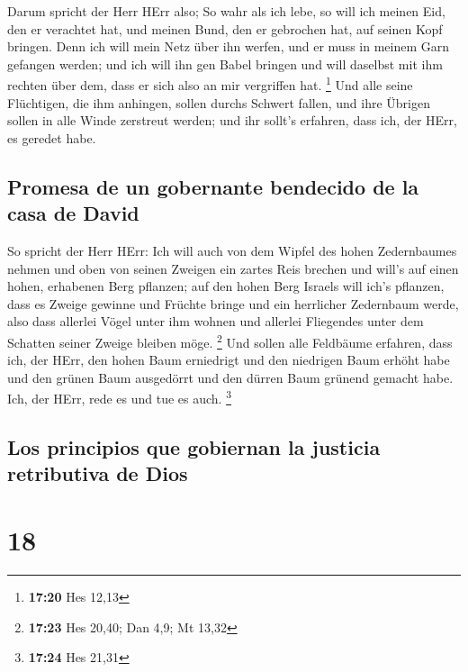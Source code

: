  Darum spricht der Herr HErr also; So wahr als ich lebe,
so will ich meinen Eid, den er verachtet hat, und meinen Bund, den er
gebrochen hat, auf seinen Kopf bringen.  Denn ich will
mein Netz über ihn werfen, und er muss in meinem Garn gefangen werden;
und ich will ihn gen Babel bringen und will daselbst mit ihm rechten
über dem, dass er sich also an mir vergriffen hat. \footnote{\textbf{17:20}
  Hes 12,13}  Und alle seine Flüchtigen, die ihm
anhingen, sollen durchs Schwert fallen, und ihre Übrigen sollen in alle
Winde zerstreut werden; und ihr sollt's erfahren, dass ich, der HErr, es
geredet habe.

\hypertarget{promesa-de-un-gobernante-bendecido-de-la-casa-de-david}{%
\subsection{Promesa de un gobernante bendecido de la casa de
David}\label{promesa-de-un-gobernante-bendecido-de-la-casa-de-david}}

 So spricht der Herr HErr: Ich will auch von dem Wipfel
des hohen Zedernbaumes nehmen und oben von seinen Zweigen ein zartes
Reis brechen und will's auf einen hohen, erhabenen Berg pflanzen;
 auf den hohen Berg Israels will ich's pflanzen, dass es
Zweige gewinne und Früchte bringe und ein herrlicher Zedernbaum werde,
also dass allerlei Vögel unter ihm wohnen und allerlei Fliegendes unter
dem Schatten seiner Zweige bleiben möge. \footnote{\textbf{17:23} Hes
  20,40; Dan 4,9; Mt 13,32}  Und sollen alle Feldbäume
erfahren, dass ich, der HErr, den hohen Baum erniedrigt und den
niedrigen Baum erhöht habe und den grünen Baum ausgedörrt und den dürren
Baum grünend gemacht habe. Ich, der HErr, rede es und tue es auch.
\footnote{\textbf{17:24} Hes 21,31}

\hypertarget{los-principios-que-gobiernan-la-justicia-retributiva-de-dios}{%
\subsection{Los principios que gobiernan la justicia retributiva de
Dios}\label{los-principios-que-gobiernan-la-justicia-retributiva-de-dios}}

\hypertarget{section-17}{%
\section{18}\label{section-17}}

